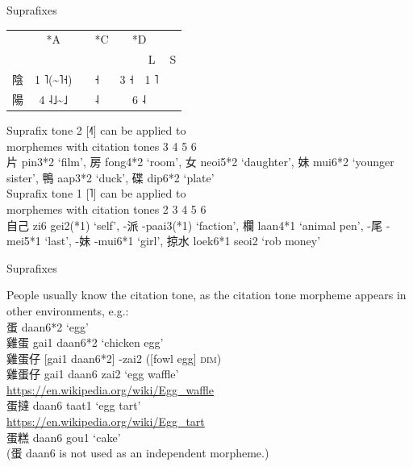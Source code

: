 \documentclass{beamer}
\begin{document}
\begin{frame}[fragile]{Suprafixes}
\begin{table}
\begin{tabular}{l||c >{\centering\arraybackslash}p{0.45cm} >{\centering\arraybackslash}p{0.45cm} c||c c}
    \hline
     & *A & \multicolumn{2}{|c|}{*B} & *C & \multicolumn{2}{c}{*D}\\
     & & & & & {\scriptsize L} & \multicolumn{1}{|c}{{\scriptsize S}}\\ \hline
    陰 & 1 ˥(\~{}˥˧) & \multicolumn{2}{|c|}{2 ˨˥\~{}˧˥} & 3 ˧ & 3 ˧ & \multicolumn{1}{|c}{1 ˥}\\ \hline 
    陽 & 4 ˨˩\~{}˩ & \multicolumn{2}{|c|}{5 ˩˧} & 6 ˨ & \multicolumn{2}{c}{6 ˨}\\ \hline
\end{tabular}
\end{table}
Suprafix tone 2 [˨˥] can be applied to\\ \quad morphemes with citation tones 3 4 5 6\\
{\scriptsize 片 pin3*2 \enquote*{film}, 房 fong4*2 \enquote*{room}, 女 neoi5*2 \enquote*{daughter}, 妹 mui6*2 \enquote*{younger sister}, 鴨 aap3*2 \enquote*{duck}, 碟 dip6*2 \enquote*{plate}}\\
\medskip
Suprafix tone 1 [˥] can be applied to\\ \quad morphemes with citation tones 2 3 4 5 6\\
{\scriptsize 自己 zi6 gei2(*1) \enquote*{self}, -派 -paai3(*1) \enquote*{faction}, 欄 laan4*1 \enquote*{animal pen}, -尾 -mei5*1 \enquote*{last}, -妹 -mui6*1 \enquote*{girl}, 掠水 loek6*1 seoi2 \enquote*{rob money}}

\end{frame}

\begin{frame}[fragile]{Suprafixes}

People usually know the citation tone, as the citation tone morpheme appears in other environments, e.g.:\\
\medskip
蛋 daan6*2 \enquote*{egg}\\
雞蛋 gai1 daan6*2 \enquote*{chicken egg}\\
雞蛋仔 [gai1 daan6*2] -zai2 ([fowl egg] \textsc{dim})\\
\medskip
雞蛋仔 gai1 daan6 zai2 \enquote*{egg waffle}\\
{\scriptsize \quad \url{https://en.wikipedia.org/wiki/Egg_waffle}}\\
蛋撻 daan6 taat1 \enquote*{egg tart}\\
{\scriptsize \quad \url{https://en.wikipedia.org/wiki/Egg_tart}}\\
蛋糕 daan6 gou1 \enquote*{cake}\\
\medskip
(蛋 daan6 is not used as an independent morpheme.)

\end{frame}
\end{document}
